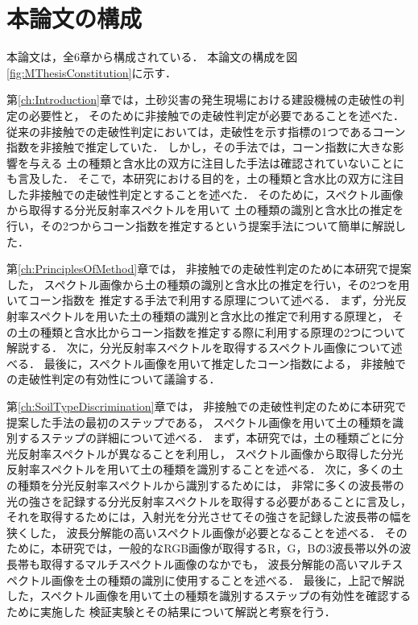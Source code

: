 \clearpage

\section{本論文の構成}\label{sec:Structure}

本論文は，全6章から構成されている．
本論文の構成を\mbox{図\ref{fig:MThesisConstitution}}に示す．

第\ref{ch:Introduction}章では，土砂災害の発生現場における建設機械の走破性の判定の必要性と，
そのために非接触での走破性判定が必要であることを述べた．
従来の非接触での走破性判定においては，走破性を示す指標の1つであるコーン指数を非接触で推定していた．
しかし，その手法では，コーン指数に大きな影響を与える
土の種類と含水比の双方に注目した手法は確認されていないことにも言及した．
そこで，本研究における目的を，土の種類と含水比の双方に注目した非接触での走破性判定とすることを述べた．
そのために，スペクトル画像から取得する分光反射率スペクトルを用いて
土の種類の識別と含水比の推定を行い，その2つからコーン指数を推定するという提案手法について簡単に解説した．

第\ref{ch:PrinciplesOfMethod}章では，
非接触での走破性判定のために本研究で提案した，
スペクトル画像から土の種類の識別と含水比の推定を行い，その2つを用いてコーン指数を
推定する手法で利用する原理について述べる．
まず，分光反射率スペクトルを用いた土の種類の識別と含水比の推定で利用する原理と，
その土の種類と含水比からコーン指数を推定する際に利用する原理の2つについて解説する．%
次に，分光反射率スペクトルを取得するスペクトル画像について述べる．%
最後に，スペクトル画像を用いて推定したコーン指数による，
非接触での走破性判定の有効性について議論する．

第\ref{ch:SoilTypeDiscrimination}章では，
非接触での走破性判定のために本研究で提案した手法の最初のステップである，
スペクトル画像を用いて土の種類を識別するステップの詳細について述べる．
まず，本研究では，土の種類ごとに分光反射率スペクトルが異なることを利用し，
スペクトル画像から取得した分光反射率スペクトルを用いて土の種類を識別することを述べる．
次に，多くの土の種類を分光反射率スペクトルから識別するためには，
非常に多くの波長帯の光の強さを記録する分光反射率スペクトルを取得する必要があることに言及し，
それを取得するためには，入射光を分光させてその強さを記録した波長帯の幅を狭くした，
波長分解能の高いスペクトル画像が必要となることを述べる．
そのために，本研究では，一般的なRGB画像が取得するR，G，Bの3波長帯以外の波長帯も取得するマルチスペクトル画像のなかでも，
波長分解能の高いマルチスペクトル画像を土の種類の識別に使用することを述べる．
最後に，上記で解説した，スペクトル画像を用いて土の種類を識別するステップの有効性を確認するために実施した
検証実験とその結果について解説と考察を行う．

